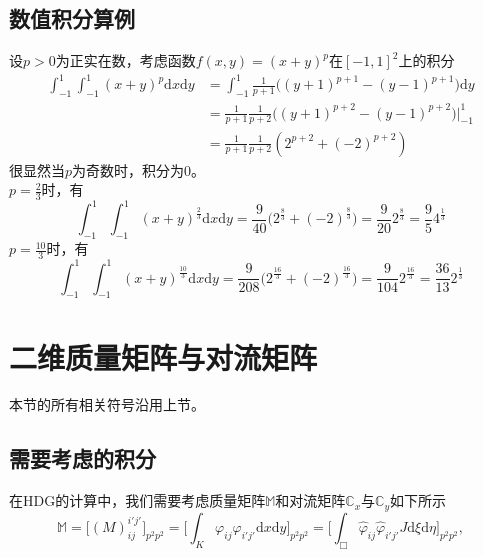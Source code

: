 \documentclass[10pt,reqno, final]{ctexartutf8}
\begin{document}
\subsection{数值积分算例}
设$p>0$为正实在数，考虑函数$f(x,y) = (x+y)^{p}$在$[-1,1]^2$上的积分
\begin{equation}\label{eg1}
\begin{split}
  \int_{-1}^{1}\!\!\int_{-1}^{1}(x+y)^{p}\text{d}x\text{d}y
  &= \int_{-1}^{1}\frac{1}{p+1}\Big( (y+1)^{p+1} -  (y-1)^{p+1}   \Big)\text{d}y \\
  &= \frac{1}{p+1}\frac{1}{p+2}  \Big( (y+1)^{p+2} -  (y-1)^{p+2}   \Big)\Big|_{-1}^1\\
  &= \frac{1}{p+1}\frac{1}{p+2}(2^{p+2} + (-2)^{p+2})
\end{split}
\end{equation}
很显然当$p$为奇数时，积分\label{eg1}为$0$。\\
$p=\frac{2}{3}$时，有
\begin{equation*}
 \int_{-1}^{1}\!\!\int_{-1}^{1}(x+y)^{\frac{2}{3}}\text{d}x\text{d}y  =
 \frac{9}{40}\big(2^{\frac{8}{3}} + (-2)^{\frac{8}{3}}  \big)=  \frac{9}{20}2^{\frac{8}{3}}=\frac{9}{5}4^{\frac{1}{3}}
\end{equation*}
$p=\frac{10}{3}$时，有
\begin{equation*}
 \int_{-1}^{1}\!\!\int_{-1}^{1}(x+y)^{\frac{10}{3}}\text{d}x\text{d}y  =
 \frac{9}{208}\big(2^{\frac{16}{3}} + (-2)^{\frac{16}{3}}  \big)=  \frac{9}{104}2^{\frac{16}{3}}=\frac{36}{13}2^{\frac{1}{3}}
\end{equation*}
\newpage
\section{二维质量矩阵与对流矩阵}
本节的所有相关符号沿用上节。
\subsection{需要考虑的积分}
在HDG的计算中，我们需要考虑质量矩阵$\mathbb{M}$和对流矩阵$\mathbb{C}_x$与$\mathbb{C}_y$如下所示
\begin{equation}\label{massmatrix}
  \mathbb{M} =\big[(M)_{ij}^{i'j'}\big]_{p^2p^2}
  =\Big[\int_K {\varphi}_{ij} {\varphi}_{i'j'}  \text{d}x\text{d}y  \Big]_{p^2p^2}
  =\Big[\int_\Box \widehat{\varphi}_{ij} \widehat{\varphi}_{i'j'}  J  \text{d}\xi\text{d}\eta  \Big]_{p^2p^2},
\end{equation}
\end{document}
